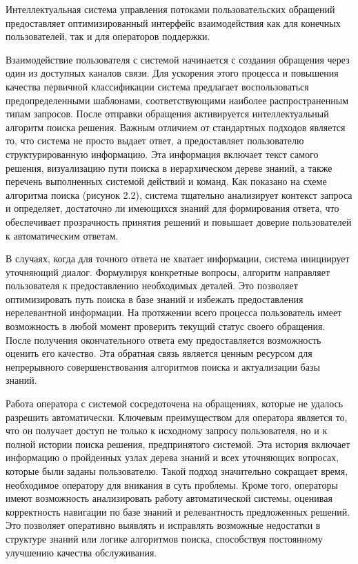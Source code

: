 
Интеллектуальная система управления потоками пользовательских обращений предоставляет оптимизированный интерфейс взаимодействия как для конечных пользователей, так и для операторов поддержки.

Взаимодействие пользователя с системой начинается с создания обращения через один из доступных каналов связи. Для ускорения этого процесса и повышения качества первичной классификации система предлагает воспользоваться предопределенными шаблонами, соответствующими наиболее распространенным типам запросов. После отправки обращения активируется интеллектуальный алгоритм поиска решения. Важным отличием от стандартных подходов является то, что система не просто выдает ответ, а предоставляет пользователю структурированную информацию. Эта информация включает текст самого решения, визуализацию пути поиска в иерархическом дереве знаний, а также перечень выполненных системой действий и команд. Как показано на схеме алгоритма поиска (рисунок 2.2), система тщательно анализирует контекст запроса и определяет, достаточно ли имеющихся знаний для формирования ответа, что обеспечивает прозрачность принятия решений и повышает доверие пользователей к автоматическим ответам.

В случаях, когда для точного ответа не хватает информации, система инициирует уточняющий диалог. Формулируя конкретные вопросы, алгоритм направляет пользователя к предоставлению необходимых деталей. Это позволяет оптимизировать путь поиска в базе знаний и избежать предоставления нерелевантной информации. На протяжении всего процесса пользователь имеет возможность в любой момент проверить текущий статус своего обращения. После получения окончательного ответа ему предоставляется возможность оценить его качество. Эта обратная связь является ценным ресурсом для непрерывного совершенствования алгоритмов поиска и актуализации базы знаний.

Работа оператора с системой сосредоточена на обращениях, которые не удалось разрешить автоматически. Ключевым преимуществом для оператора является то, что он получает доступ не только к исходному запросу пользователя, но и к полной истории поиска решения, предпринятого системой. Эта история включает информацию о пройденных узлах дерева знаний и всех уточняющих вопросах, которые были заданы пользователю. Такой подход значительно сокращает время, необходимое оператору для вникания в суть проблемы. Кроме того, операторы имеют возможность анализировать работу автоматической системы, оценивая корректность навигации по базе знаний и релевантность предложенных решений. Это позволяет оперативно выявлять и исправлять возможные недостатки в структуре знаний или логике алгоритмов поиска, способствуя постоянному улучшению качества обслуживания.

